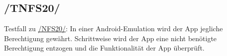 \subsection*{/TNFS20/}
\label{/TNFS20/} Testfall zu \hyperref[/NFS20/]{/NFS20/}: In einer \Gls{Android}-\Gls{Emulation} wird der App jegliche Berechtigung gewährt.
Schrittweise wird der App eine nicht benötigte Berechtigung entzogen und die Funktionalität der App überprüft.